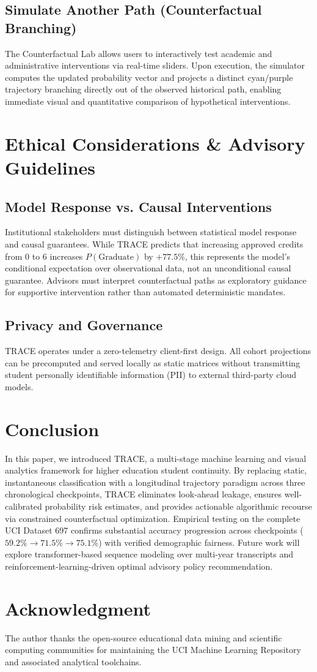 \documentclass[conference]{IEEEtran}
\begin{document}
\subsection{Simulate Another Path (Counterfactual Branching)}
The Counterfactual Lab allows users to interactively test academic and administrative interventions via real-time sliders. Upon execution, the simulator computes the updated probability vector and projects a distinct cyan/purple trajectory branching directly out of the observed historical path, enabling immediate visual and quantitative comparison of hypothetical interventions.

\section{Ethical Considerations \& Advisory Guidelines}

\subsection{Model Response vs. Causal Interventions}
Institutional stakeholders must distinguish between statistical model response and causal guarantees. While TRACE predicts that increasing approved credits from 0 to 6 increases $P(\text{Graduate})$ by $+77.5\%$, this represents the model's conditional expectation over observational data, not an unconditional causal guarantee. Advisors must interpret counterfactual paths as exploratory guidance for supportive intervention rather than automated deterministic mandates.

\subsection{Privacy and Governance}
TRACE operates under a zero-telemetry client-first design. All cohort projections can be precomputed and served locally as static matrices without transmitting student personally identifiable information (PII) to external third-party cloud models.

\section{Conclusion}

In this paper, we introduced TRACE, a multi-stage machine learning and visual analytics framework for higher education student continuity. By replacing static, instantaneous classification with a longitudinal trajectory paradigm across three chronological checkpoints, TRACE eliminates look-ahead leakage, ensures well-calibrated probability risk estimates, and provides actionable algorithmic recourse via constrained counterfactual optimization. Empirical testing on the complete UCI Dataset 697 confirms substantial accuracy progression across checkpoints ($59.2\% \to 71.5\% \to 75.1\%$) with verified demographic fairness. Future work will explore transformer-based sequence modeling over multi-year transcripts and reinforcement-learning-driven optimal advisory policy recommendation.

\section*{Acknowledgment}
The author thanks the open-source educational data mining and scientific computing communities for maintaining the UCI Machine Learning Repository and associated analytical toolchains.



\end{document}
